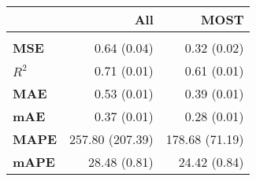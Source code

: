 \centering\begin{tabular}{l|rr}
\toprule
{} &     \textbf{All} &   \textbf{MOST} \\
\midrule
      &                  &                 \\
\textbf{MSE  } &  0.64 (0.04) &  0.32 (0.02) \\
\textbf{$R^2$} &  0.71 (0.01) &  0.61 (0.01) \\
\textbf{MAE  } &  0.53 (0.01) &  0.39 (0.01) \\
\textbf{mAE  } &  0.37 (0.01) &  0.28 (0.01) \\
\textbf{MAPE } &  257.80 (207.39) &  178.68 (71.19) \\
\textbf{mAPE } &  28.48 (0.81) &  24.42 (0.84) \\
\bottomrule
\end{tabular}
